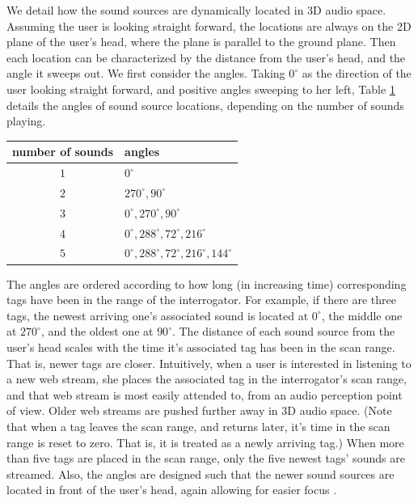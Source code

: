 \documentclass[conference]{IEEEtran}
\begin{document}
We detail how the sound sources are dynamically located in 3D audio space.  Assuming the user is looking straight forward, the locations are always on the 2D plane of the user's head, where the plane is parallel to the ground plane.  Then each location can be characterized by the distance from the user's head, and the angle it sweeps out.  We first consider the angles.  Taking $0^{\circ}$ as the direction of the user looking straight forward, and positive angles sweeping to her left, Table \ref{angles} details the angles of sound source locations, depending on the number of sounds playing.
\begin{table}[h]
\begin{center}
  \begin{tabular}{ c | l }
   number of sounds & angles \\ \hline 
    $1$ & $0^{\circ}$ \\ \hline
    $2$ & $270^{\circ}, 90^{\circ}$ \\ \hline
    $3$ & $0^{\circ}, 270^{\circ}, 90^{\circ}$ \\ \hline
    $4$ & $0^{\circ}, 288^{\circ}, 72^{\circ}, 216^{\circ}$ \\ \hline
    $5$ & $0^{\circ}, 288^{\circ}, 72^{\circ}, 216^{\circ}, 144^{\circ}$  
  \end{tabular}
 \end{center}
 \label{angles}
\end{table}
The angles are ordered according to how long (in increasing time) corresponding tags have been in the range of the interrogator.  For example, if there are three tags, the newest arriving one's associated sound is located at $0^{\circ}$, the middle one at $270^{\circ}$, and the oldest one at $90^{\circ}$.  The distance of each sound source from the user's head scales with the time it's associated tag has been in the scan range.  That is, newer tags are closer.  Intuitively, when a user is interested in listening to a new web stream, she places the associated tag in the interrogator's scan range, and that web stream is most easily attended to, from an audio perception point of view.  Older web streams are pushed further away in 3D audio space.  (Note that when a tag leaves the scan range, and returns later, it's time in the scan range is reset to zero.  That is, it is treated as a newly arriving tag.)  When more than five tags are placed in the scan range, only the five newest tags' sounds are streamed.  Also, the angles are designed such that the newer sound sources are located in front of the user's head, again allowing for easier focus \cite{2009Vazquez-Alvarez}.
\end{document}
